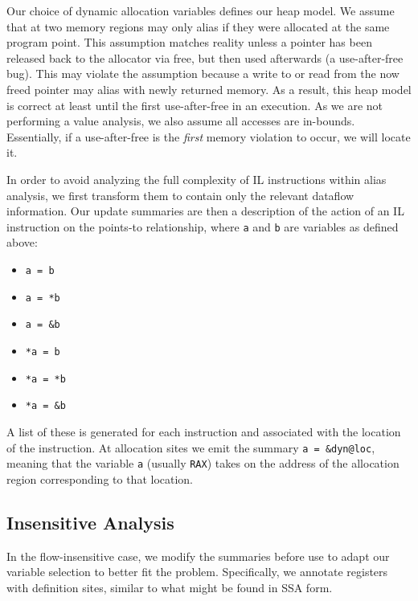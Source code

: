 Our choice of dynamic allocation variables defines our heap model.
We assume that at two memory regions may only alias if they were allocated at the same program point.
This assumption matches reality unless a pointer has been released back to the allocator via free, but then used afterwards (a use-after-free bug).
This may violate the assumption because a write to or read from the now freed pointer may alias with newly returned memory.
As a result, this heap model is correct at least until the first use-after-free in an execution.
As we are not performing a value analysis, we also assume all accesses are in-bounds.
Essentially, if a use-after-free is the \emph{first} memory violation to occur, we will locate it.

In order to avoid analyzing the full complexity of IL instructions within alias analysis, we first transform them to contain only the relevant dataflow information.
Our update summaries are then a description of the action of an IL instruction on the points-to relationship, where \texttt{a} and \texttt{b} are variables as defined above:

\begin{itemize}
\item \texttt{a = b}
\item \texttt{a = *b}
\item \texttt{a = \&b}
\item \texttt{*a = b}
\item \texttt{*a = *b}
\item \texttt{*a = \&b}
\end{itemize}

A list of these is generated for each instruction and associated with
the location of the instruction.  At allocation sites we emit the
summary \texttt{a = \&dyn@loc}, meaning that the variable \texttt{a}
(usually \texttt{RAX}) takes on the address of the allocation region
corresponding to that location.  %

\subsection{Insensitive Analysis}
In the flow-insensitive case, we modify the summaries before use to adapt our variable selection to better fit the problem.
Specifically, we annotate registers with definition sites, similar to what might be found in SSA form.

